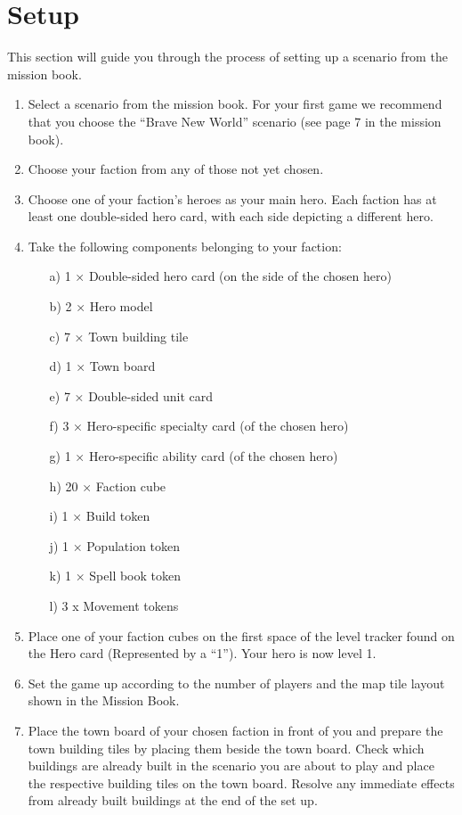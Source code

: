 \documentclass[12pt]{article}
\begin{document}
\section{Setup}
This section will guide you through the process of setting up a scenario from the mission book.

\begin{enumerate}
\item Select a scenario from the mission book. For your first game we recommend that you choose the “Brave New World” scenario (see page 7 in the mission book).
\item Choose your faction from any of those not yet chosen.
\item Choose one of your faction’s heroes as your main hero. Each faction has at least one double-sided hero card, with each side depicting a different hero.
\item Take the following components belonging to your faction:
\begin{itemize}
\item[a)]1 × Double-sided hero card (on the side of the chosen hero)
\item[b)]2 × Hero model
\item[c)]7 × Town building tile
\item[d)]1 × Town board
\item[e)]7 × Double-sided unit card
\item[f)]3 × Hero-specific specialty card (of the chosen hero)
\item[g)]1 × Hero-specific ability card (of the chosen hero)
\item[h)]20 × Faction cube
\item[i)]1 × Build token
\item[j)]1 × Population token
\item[k)]1 × Spell book token
\item[l)]3 x Movement tokens
\end{itemize}
\item Place one of your faction cubes on the first space of the level tracker found on the Hero card (Represented by a “1”). Your hero is now level 1.
\item Set the game up according to the number of players and the map tile layout shown in the Mission Book.
\item Place the town board of your chosen faction in front of you and prepare the town building tiles by placing them beside the town board. Check which buildings are already built in the scenario you are about to play and place the respective building tiles on the town board. Resolve any immediate effects from already built buildings at the end of the set up.

\end{enumerate}
\end{document}
